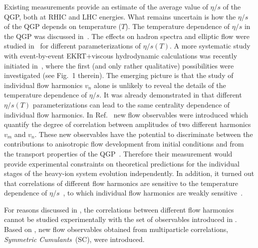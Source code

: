Existing measurements provide an estimate of the average value of $\eta/s$ of the QGP, both at RHIC and LHC energies. What remains uncertain is how the $\eta/s$ of the QGP depends on temperature ($T$). The temperature dependence of $\eta/s$ in the QGP was discussed in~\cite{Csernai:2006zz}. The effects on hadron spectra and elliptic flow were studied in~\cite{Niemi:2011ix} for different parameterizations of $\eta/s(T)$.  A more systematic study with event-by-event EKRT+viscous hydrodynamic calculations was recently initiated in~\cite{Niemi:2015qia}, where the first (and only rather qualitative) possibilities were investigated (see Fig.~1 therein). The emerging picture is that the study of individual flow harmonics $v_n$ alone is unlikely to reveal the details of the temperature dependence of $\eta/s$.
It was already demonstrated in \cite{Niemi:2015qia} that different $\eta/s(T)$ parameterizations can lead to the same centrality dependence of individual flow harmonics. In Ref.~\cite{Niemi:2012aj} new flow observables were introduced which quantify the degree of correlation between amplitudes of two different harmonics $v_m$ and $v_n$. These new observables have the potential to discriminate between the contributions to anisotropic flow development from initial conditions and from the transport properties of the QGP~\cite{Niemi:2012aj}. Therefore their measurement would provide experimental constraints on theoretical predictions for the individual stages of the heavy-ion system evolution independently. In addition, it turned out that correlations of different flow harmonics are sensitive to the temperature dependence of $\eta/s$~\cite{ALICE:2016kpq}, to which individual flow harmonics are weakly sensitive~\cite{Niemi:2015qia}. 
 
For reasons discussed in \cite{ALICE:2016kpq,Bilandzic:2013kga}, the correlations between different flow harmonics cannot be studied experimentally with the set of observables introduced in \cite{Niemi:2012aj}. 
Based on \cite{Bilandzic:2013kga}, new flow observables obtained from multiparticle correlations, \textit{Symmetric Cumulants}~(SC), were introduced. 

